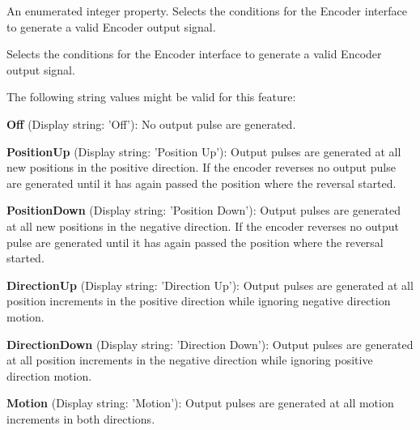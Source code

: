 An enumerated integer property. Selects the conditions for the Encoder interface to generate a valid Encoder output signal. 

Selects the conditions for the Encoder interface to generate a valid Encoder output signal.

The following string values might be valid for this feature\+:
\begin{DoxyItemize}
\item {\bfseries Off} (Display string\+: 'Off')\+: No output pulse are generated.
\item {\bfseries Position\+Up} (Display string\+: 'Position Up')\+: Output pulses are generated at all new positions in the positive direction. If the encoder reverses no output pulse are generated until it has again passed the position where the reversal started.
\item {\bfseries Position\+Down} (Display string\+: 'Position Down')\+: Output pulses are generated at all new positions in the negative direction. If the encoder reverses no output pulse are generated until it has again passed the position where the reversal started.
\item {\bfseries Direction\+Up} (Display string\+: 'Direction Up')\+: Output pulses are generated at all position increments in the positive direction while ignoring negative direction motion.
\item {\bfseries Direction\+Down} (Display string\+: 'Direction Down')\+: Output pulses are generated at all position increments in the negative direction while ignoring positive direction motion.
\item {\bfseries Motion} (Display string\+: 'Motion')\+: Output pulses are generated at all motion increments in both directions.
\end{DoxyItemize}

